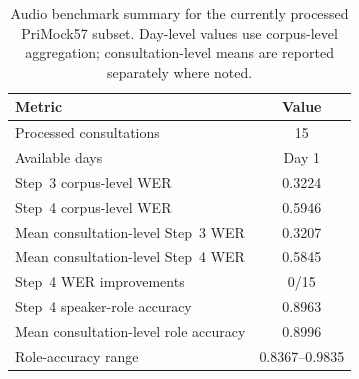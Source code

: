 \begin{table}[ht]
\centering
\caption{Audio benchmark summary for the currently processed PriMock57 subset. Day-level values use corpus-level aggregation; consultation-level means are reported separately where noted.}
\label{tab:audio-benchmark-summary}
\begin{tabular}{lc}
\hline
Metric & Value \\
\hline
Processed consultations & 15 \\
Available days & Day 1 \\
Step~3 corpus-level WER & 0.3224 \\
Step~4 corpus-level WER & 0.5946 \\
Mean consultation-level Step~3 WER & 0.3207 \\
Mean consultation-level Step~4 WER & 0.5845 \\
Step~4 WER improvements & 0/15 \\
Step~4 speaker-role accuracy & 0.8963 \\
Mean consultation-level role accuracy & 0.8996 \\
Role-accuracy range & 0.8367--0.9835 \\
\hline
\end{tabular}
\end{table}
